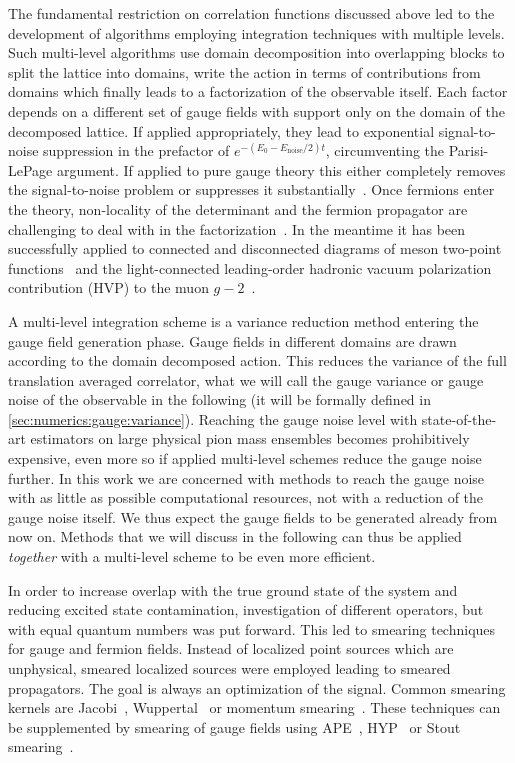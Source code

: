 The fundamental restriction on correlation functions discussed above led to the development of algorithms employing integration techniques with multiple levels.
Such multi-level algorithms use domain decomposition into overlapping blocks to split the lattice into domains, write the action in terms of contributions from domains which finally leads to a factorization of the observable itself.
Each factor depends on a different set of gauge fields with support only on the domain of the decomposed lattice.
If applied appropriately, they lead to exponential signal-to-noise suppression in the prefactor of $e^{-(E_0 - E_{\text{noise}}/2)t}$, circumventing the Parisi-LePage argument.
If applied to pure gauge theory this either completely removes the signal-to-noise problem or suppresses it substantially~\cite{Luscher:2001up,Meyer:2002cd,DellaMorte:2007zz,DellaMorte:2008jd,della2011novel}.
Once fermions enter the theory, non-locality of the determinant and the fermion propagator are challenging to deal with in the factorization~\cite{Ce:2016idq,Ce:2016ajy,Giusti:2017ksp,Ce:2017ndt}.
In the meantime it has been successfully applied to connected and disconnected diagrams of meson two-point functions~\cite{Giusti:2018vxm} and the light-connected leading-order hadronic vacuum polarization contribution (HVP) to the muon $g-2$~\cite{DallaBrida:2020cik,Giusti:2021qhk}.

A multi-level integration scheme is a variance reduction method entering the gauge field generation phase.
Gauge fields in different domains are drawn according to the domain decomposed action.
This reduces the variance of the full translation averaged correlator, \ie what we will call the gauge variance or gauge noise of the observable in the following (it will be formally defined in \cref{sec:numerics:gauge:variance}).
Reaching the gauge noise level with state-of-the-art estimators on large physical pion mass ensembles becomes prohibitively expensive, even more so if applied multi-level schemes reduce the gauge noise further.
In this work we are concerned with methods to reach the gauge noise with as little as possible computational resources, not with a reduction of the gauge noise itself.
We thus expect the gauge fields to be generated already from now on.
Methods that we will discuss in the following can thus be applied \emph{together} with a multi-level scheme to be even more efficient. 

In order to increase overlap with the true ground state of the system and reducing excited state contamination, investigation of different operators, but with equal quantum numbers was put forward.
This led to smearing techniques for gauge and fermion fields.
Instead of localized point sources which are unphysical, smeared localized sources were employed leading to smeared propagators.
The goal is always an optimization of the signal.
Common smearing kernels are Jacobi~\cite{GUSKEN1989,PhysRevD.56.2743,Collins:1992fj,UKQCD:1993gym}, Wuppertal~\cite{GUSKEN1990361} or momentum smearing~\cite{Bali:2016lva}.
These techniques can be supplemented by smearing of gauge fields using APE~\cite{ALBANESE1987163}, HYP~\cite{Hasenfratz:2001hp} or Stout smearing~\cite{PhysRevD.69.054501}.

